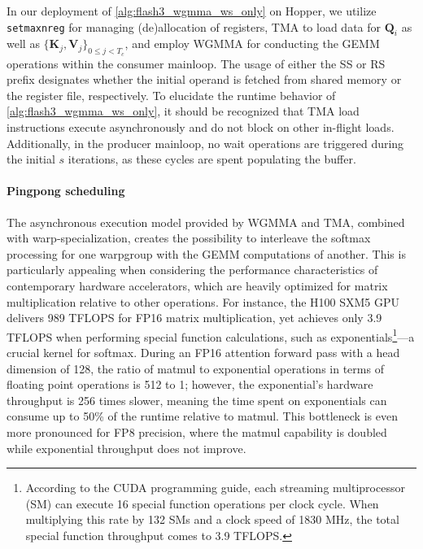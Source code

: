 In our deployment of \cref{alg:flash3_wgmma_ws_only} on Hopper, we utilize \verb|setmaxnreg| for managing (de)allocation of registers, TMA to load data for $\mathbf{Q}_i$ as well as $\{ \mathbf{K}_j, \mathbf{V}_j \}_{0 \leq j < T_c}$, and employ WGMMA for conducting the GEMM operations within the consumer mainloop. The usage of either the SS or RS prefix designates whether the initial operand is fetched from shared memory or the register file, respectively. To elucidate the runtime behavior of \cref{alg:flash3_wgmma_ws_only}, it should be recognized that TMA load instructions execute asynchronously and do not block on other in-flight loads. Additionally, in the producer mainloop, no wait operations are triggered during the initial $s$ iterations, as these cycles are spent populating the buffer.

\paragraph{Pingpong scheduling} The asynchronous execution model provided by WGMMA and TMA, combined with warp-specialization, creates the possibility to interleave the softmax processing for one warpgroup with the GEMM computations of another. This is particularly appealing when considering the performance characteristics of contemporary hardware accelerators, which are heavily optimized for matrix multiplication relative to other operations. For instance, the H100 SXM5 GPU delivers 989 TFLOPS for FP16 matrix multiplication, yet achieves only 3.9 TFLOPS when performing special function calculations, such as exponentials\footnote{According to the CUDA programming guide, each streaming multiprocessor (SM) can execute 16 special function operations per clock cycle. When multiplying this rate by 132 SMs and a clock speed of 1830 MHz, the total special function throughput comes to 3.9 TFLOPS.}—a crucial kernel for softmax. During an FP16 attention forward pass with a head dimension of 128, the ratio of matmul to exponential operations in terms of floating point operations is 512 to 1; however, the exponential’s hardware throughput is 256 times slower, meaning the time spent on exponentials can consume up to 50\% of the runtime relative to matmul. This bottleneck is even more pronounced for FP8 precision, where the matmul capability is doubled while exponential throughput does not improve.

